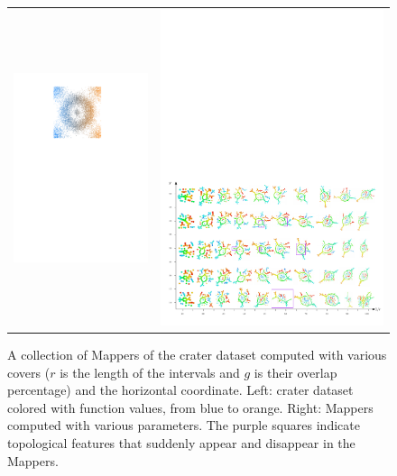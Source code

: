 \begin{figure}
\begin{tabular}{cc}
\includegraphics[width=6cm]{figures/crater_instab} & \includegraphics[width=10cm]{figures/instab}
\end{tabular}
\caption[Instability of Mapper computed with close covers]{\label{fig:instab}
A collection of Mappers of the crater dataset computed with various covers ($r$ is the length of the intervals and $g$ is their overlap percentage)
and the horizontal coordinate.
Left: crater dataset colored with function values, from blue to orange. Right: Mappers computed with various parameters. 
The purple squares indicate topological features that suddenly appear and disappear in the Mappers. 
}
\end{figure}


